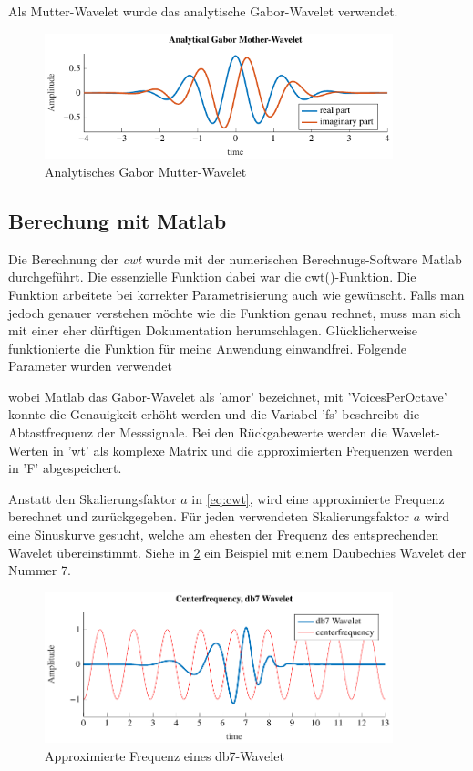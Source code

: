 \begin{refsection}
Als Mutter-Wavelet wurde das analytische Gabor-Wavelet verwendet.
\begin{figure}[h]
\centering
\includegraphics[width=0.9\textwidth]{papers/wwt/images/gabor.pdf}
\caption{Analytisches Gabor Mutter-Wavelet}
\label{fig:gabor_plot}
\end{figure}

\newpage
\subsection{Berechung mit Matlab}
Die Berechnung der \textit{cwt} wurde mit der numerischen Berechnugs-Software Matlab durchgeführt.
Die essenzielle Funktion dabei war die cwt()-Funktion. Die Funktion arbeitete bei korrekter Parametrisierung auch wie gewünscht. Falls man jedoch genauer verstehen möchte wie die Funktion genau rechnet, muss man sich mit einer eher dürftigen Dokumentation herumschlagen. Glücklicherweise funktionierte die Funktion für meine Anwendung einwandfrei. Folgende Parameter wurden verwendet

\label{fig:matlab_code_cwt}
wobei Matlab das Gabor-Wavelet als 'amor' bezeichnet, mit 'VoicesPerOctave' konnte die Genauigkeit erhöht werden und die Variabel 'fs' beschreibt die Abtastfrequenz der Messsignale.
Bei den Rückgabewerte werden die Wavelet-Werten in 'wt' als komplexe Matrix und die approximierten Frequenzen werden in 'F' abgespeichert.

Anstatt den Skalierungsfaktor $a$ in \ref{eq:cwt}, wird eine approximierte Frequenz berechnet und zurückgegeben.
Für jeden verwendeten Skalierungsfaktor $a$ wird eine Sinuskurve gesucht, welche am ehesten der Frequenz des entsprechenden Wavelet übereinstimmt. Siehe in \ref{fig:centerf} ein Beispiel mit einem Daubechies Wavelet der Nummer 7.
\begin{figure}[h]
	\centering
	\includegraphics[width=0.9\textwidth]{papers/wwt/images/centerf.pdf}
	\caption{Approximierte Frequenz eines db7-Wavelet}
	\label{fig:centerf}
\end{figure}



\end{refsection}
